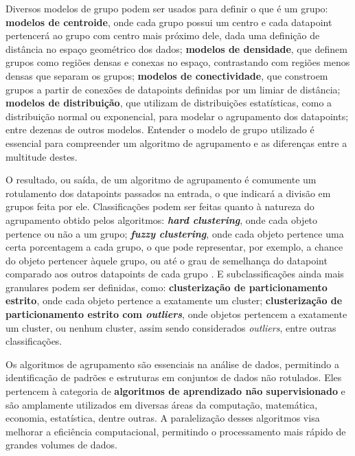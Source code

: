 \documentclass[12pt,
openright, 
oneside, %
a4paper,    %
brazil]{facom-ufu-abntex2}
\begin{document}

Diversos modelos de grupo podem ser usados para definir o que é um grupo: \textbf{modelos de centroide}, onde cada grupo possui um centro e cada datapoint pertencerá ao grupo com centro mais próximo dele, dada uma definição de distância no espaço geométrico dos dados; \textbf{modelos de densidade}, que definem grupos como regiões densas e conexas no espaço, contrastando com regiões menos densas que separam os grupos; \textbf{modelos de conectividade}, que constroem grupos a partir de conexões de datapoints definidas por um limiar de distância; \textbf{modelos de distribuição}, que utilizam de distribuições estatísticas, como a distribuição normal ou exponencial, para modelar o agrupamento dos datapoints; entre dezenas de outros modelos. Entender o modelo de grupo utilizado é essencial para compreender um algoritmo de agrupamento e as diferenças entre a multitude destes.

O resultado, ou saída, de um algoritmo de agrupamento é comumente um rotulamento dos datapoints passados na entrada, o que indicará a divisão em grupos feita por ele. Classificações podem ser feitas quanto à natureza do agrupamento obtido pelos algoritmos: \textbf{\textit{hard clustering}}, onde cada objeto pertence ou não a um grupo; \textbf{\textit{fuzzy clustering}}, onde cada objeto pertence uma certa porcentagem a cada grupo, o que pode representar, por exemplo, a chance do objeto pertencer àquele grupo, ou até o grau de semelhança do datapoint comparado aos outros datapoints de cada grupo \cite{FuzzyClusteringSurvey}. E subclassificações ainda mais granulares podem ser definidas, como: \textbf{clusterização de particionamento estrito}, onde cada objeto pertence a exatamente um cluster; \textbf{clusterização de particionamento estrito com \textit{outliers}}, onde objetos pertencem a exatamente um cluster, ou nenhum cluster, assim sendo considerados \textit{outliers}, entre outras classificações.

Os algoritmos de agrupamento são essenciais na análise de dados, permitindo a identificação de padrões e estruturas em conjuntos de dados não rotulados. Eles pertencem à categoria de \textbf{algoritmos de aprendizado não supervisionado} e são amplamente utilizados em diversas áreas da computação, matemática, economia, estatística, dentre outras. A paralelização desses algoritmos visa melhorar a eficiência computacional, permitindo o processamento mais rápido de grandes volumes de dados.
\end{document}
